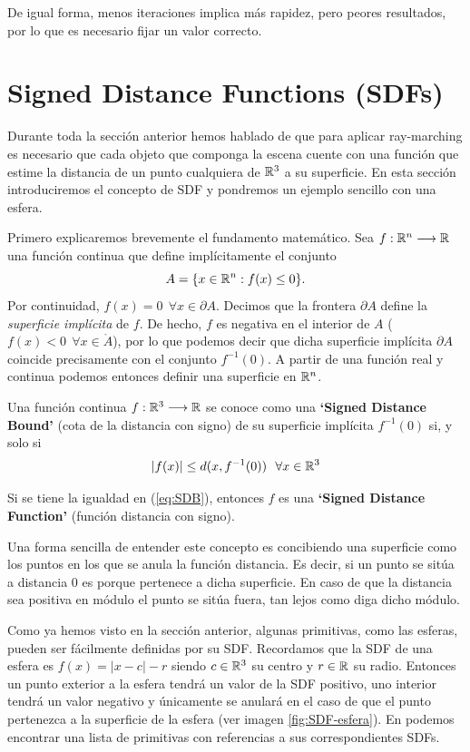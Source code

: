 De igual forma, menos iteraciones implica más rapidez, pero peores resultados, por lo que es necesario fijar un valor correcto.

\section{Signed Distance Functions (SDFs)}
\label{section:SDFs}

Durante toda la sección anterior hemos hablado de que para aplicar ray-marching es necesario que cada objeto que componga la escena cuente con una función que estime la distancia de un punto cualquiera de $\mathbb{R}^3$ a su superficie. En esta sección introduciremos el concepto de SDF y pondremos un ejemplo sencillo con una esfera.

Primero explicaremos brevemente el fundamento matemático. Sea $f:\mathbb{R}^n\longrightarrow\mathbb{R}$ una función continua que define implícitamente el conjunto 
$$
A = \{x\in\mathbb{R}^n: f(x)\leq 0\}.
$$
Por continuidad, $f(x)=0\ \ \forall x\in\partial A$. Decimos que la frontera $\partial A$ define la \textit{superficie implícita} de $f$. De hecho, $f$ es negativa en el interior de $A$ ($f(x)<0 \ \ \forall x\in\mathring A$), por lo que podemos decir que dicha superficie implícita $\partial A$ coincide precisamente con el conjunto $f^{-1}(0)$. A partir de una función real y continua podemos entonces definir una superficie en $\mathbb{R}^n$.

\begin{definicion}[SDF]
    Una función continua $f:\mathbb{R}^3\longrightarrow\mathbb{R}$ se conoce como una \textbf{`Signed Distance Bound'} (cota de la distancia con signo) de su superficie implícita $f^{-1}(0)$ si, y solo si
    \begin{equation}
        \label{eq:SDB}
        |f(x)|\leq d(x,f^{-1}(0)) \ \ \forall x\in\mathbb{R}^3
    \end{equation}
    
    Si se tiene la igualdad en (\ref{eq:SDB}), entonces $f$ es una \textbf{`Signed Distance Function'} (función distancia con signo).
\end{definicion}

Una forma sencilla de entender este concepto es concibiendo una superficie como los puntos en los que se anula la función distancia. Es decir, si un punto se sitúa a distancia 0 es porque pertenece a dicha superficie. En caso de que la distancia sea positiva en módulo el punto se sitúa fuera, tan lejos como diga dicho módulo.

Como ya hemos visto en la sección anterior, algunas primitivas, como las esferas, pueden ser fácilmente definidas por su SDF. Recordamos que la SDF de una esfera es $f(x)=|x-c|-r$ siendo $c\in\mathbb{R}^3$ su centro y $r\in\mathbb{R}$ su radio. Entonces un punto exterior a la esfera tendrá un valor de la SDF positivo, uno interior tendrá un valor negativo y únicamente se anulará en el caso de que el punto pertenezca a la superficie de la esfera (ver imagen \ref{fig:SDF-esfera}). En \cite[Table 1]{Hart-1995} podemos encontrar una lista de primitivas con referencias a sus correspondientes SDFs.

